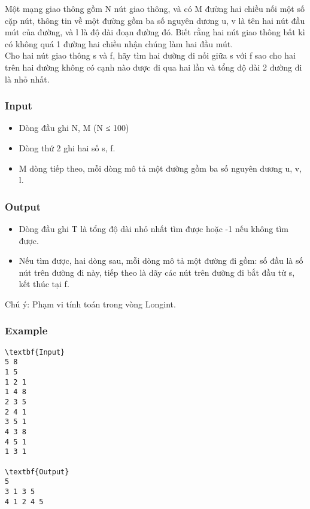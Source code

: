 

Một mạng giao thông gồm N nút giao thông, và có M đường hai chiều nối một số cặp nút, thông tin về một đường gồm ba số nguyên dương u, v là tên hai nút đầu mút của đường, và l là độ dài đoạn đường đó. Biết rằng hai nút giao thông bất kì có không quá 1 đường hai chiều nhận chúng làm hai đầu mút.
\\Cho hai nút giao thông s và f, hãy tìm hai đường đi nối giữa s với f sao cho hai trên hai đường không có cạnh nào được đi qua hai lần và tổng độ dài 2 đường đi là nhỏ nhất.

\subsubsection{Input}
\begin{itemize}
	\item Dòng đầu ghi N, M (N ≤ 100)
	\item Dòng thứ 2 ghi hai số s, f.
	\item M dòng tiếp theo, mỗi dòng mô tả một đường gồm ba số nguyên dương u, v, l.
\end{itemize}

\subsubsection{Output}
\begin{itemize}
	\item Dòng đầu ghi T là tổng độ dài nhỏ nhất tìm được hoặc -1 nếu không tìm được.
	\item Nếu tìm được, hai dòng sau, mỗi dòng mô tả một đường đi gồm: số đầu là số nút trên đường đi này, tiếp theo là dãy các nút trên đường đi bắt đầu từ s, kết thúc tại f.
\end{itemize}

Chú ý: Phạm vi tính toán trong vòng Longint.

\subsubsection{Example}
\begin{verbatim}
\textbf{Input}
5 8
1 5
1 2 1
1 4 8
2 3 5
2 4 1
3 5 1
4 3 8
4 5 1
1 3 1

\textbf{Output}
5
3 1 3 5 
4 1 2 4 5
\end{verbatim}
